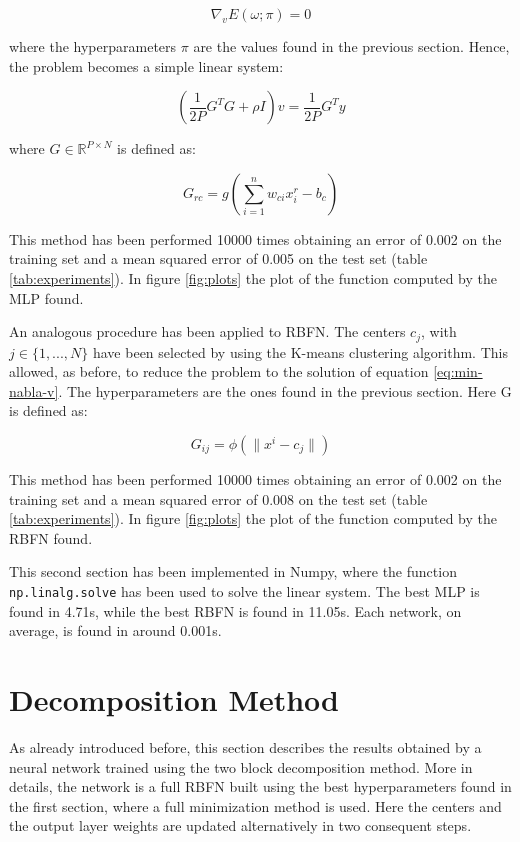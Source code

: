 \documentclass[a4paper]{article}
\numberwithin{equation}{section} %
\numberwithin{figure}{section} %
\numberwithin{table}{section} %
\theoremstyle{definition}
\begin{document}
\begin{equation}
 	\label{eq:min-nabla-v}
	\nabla_v E(\omega; \pi) = 0
\end{equation}

\noindent where the hyperparameters $\pi$ are the values found in the previous
section. Hence, the problem becomes a simple linear system:

\[ \left( \frac{1}{2P} G^T G + \rho I \right) v = \frac{1}{2P} G^T y \]

\noindent where $G \in \mathbb{R}^{P \times N}$ is defined as:

\[ G_{rc} = g\left( \sum_{i=1}^{n} w_{ci}x_i^r - b_c \right) \]

This method has been performed 10000 times obtaining an error of 0.002 on the
training set and a mean squared error of 0.005 on the test set (table \ref{tab:experiments}). In figure
\ref{fig:plots} the plot of the function computed by the MLP found.

An analogous procedure has been applied to RBFN.
The centers $c_j$, with $ j \in \{ 1,  ..., N \} $ have been selected by
using the K-means clustering algorithm. This allowed, as before, to reduce the
problem to the solution of equation \ref{eq:min-nabla-v}. The hyperparameters
are the ones found in the previous section. Here G is defined as:

\[ G_{ij} = \phi\left( \| x^i - c_j \| \right) \]

This method has been performed 10000 times obtaining an error of 0.002 on the
training set and a mean squared error of 0.008 on the test set (table \ref{tab:experiments}). In figure
\ref{fig:plots} the plot of the function computed by the RBFN found.

This second section has been implemented in Numpy, where the function
\texttt{np.linalg.solve} has been used to solve the linear system. The best MLP
is found in 4.71s, while the best RBFN is found in 11.05s. Each network, on average,
is found in around 0.001s.


\section{Decomposition Method}
As already introduced before, this section describes the results obtained by a
neural network trained using the two block decomposition method.
More in details, the network is a full RBFN built using the best hyperparameters
found in the first section, where a full minimization method is used.
Here the centers and the output layer weights are updated alternatively in two consequent steps.
\end{document}
